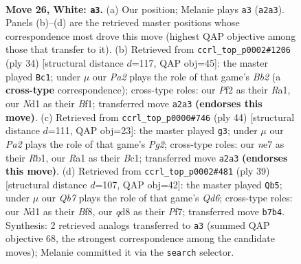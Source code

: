 \documentclass[11pt]{article}
\begin{document}
\clearpage

\begin{figure}[p]\centering
\begin{subfigure}{0.46\textwidth}\centering
\resizebox{\linewidth}{!}{%
\newchessgame
\chessboard[
  setfen={1n1qkb1r/1Q2n3/r1p3p1/p2p2P1/1p1P2Bp/1P5P/PBP1KP2/R2N3R w - - 5 26},
  showmover=false,
  pgfstyle=straightmove, color=movearrow, markmove={a2-a3}
]}
\caption{}
\end{subfigure}\hfill
\begin{subfigure}{0.46\textwidth}\centering
\resizebox{\linewidth}{!}{%
\newchessgame
\chessboard[
  setfen={r2q2k1/ppp2ppb/4nn1p/P2pQ3/8/1PPN1P2/1BP3PP/R4BK1 w - - 3 18},
  showmover=false,
  pgfstyle=straightmove, color=movearrow, markmove={b2-c1}
]}
\caption{}
\end{subfigure}
\\[4pt]
\begin{subfigure}{0.46\textwidth}\centering
\resizebox{\linewidth}{!}{%
\newchessgame
\chessboard[
  setfen={r4r2/1ppqn1pk/p4bnp/4pp1Q/PP6/2PP3P/2B2PP1/1RB1RNK1 w - - 8 23},
  showmover=false,
  pgfstyle=straightmove, color=movearrow, markmove={g2-g3}
]}
\caption{}
\end{subfigure}\hfill
\begin{subfigure}{0.46\textwidth}\centering
\resizebox{\linewidth}{!}{%
\newchessgame
\chessboard[
  setfen={r3kb1r/1p2pp1p/2p1b1p1/p3Pn2/N2P1P2/P2q4/1B1N1RPP/1R1Q2K1 b kq - 1 20},
  showmover=false,
  pgfstyle=straightmove, color=movearrow, markmove={d3-b5}
]}
\caption{}
\end{subfigure}
\caption{\textbf{Move 26, White: \texttt{a3}.} (a) Our position; Melanie plays \texttt{a3} (\texttt{a2a3}). Panels (b)--(d) are the retrieved master positions whose correspondence most drove this move (highest QAP objective among those that transfer to it). (b) Retrieved from \texttt{ccrl\_top\_p0002\#1206} (ply 34) [structural distance $d$=117, QAP obj=45]: the master played \texttt{Bc1}; under $\mu$ our \emph{Pa2} plays the role of that game's \emph{Bb2} (a \textbf{cross-type} correspondence); cross-type roles: our \emph{P}f2 as their \emph{R}a1, our \emph{N}d1 as their \emph{B}f1; transferred move \texttt{a2a3} \textbf{(endorses this move)}. (c) Retrieved from \texttt{ccrl\_top\_p0000\#746} (ply 44) [structural distance $d$=111, QAP obj=23]: the master played \texttt{g3}; under $\mu$ our \emph{Pa2} plays the role of that game's \emph{Pg2}; cross-type roles: our \emph{n}e7 as their \emph{R}b1, our \emph{R}a1 as their \emph{B}c1; transferred move \texttt{a2a3} \textbf{(endorses this move)}. (d) Retrieved from \texttt{ccrl\_top\_p0002\#481} (ply 39) [structural distance $d$=107, QAP obj=42]: the master played \texttt{Qb5}; under $\mu$ our \emph{Qb7} plays the role of that game's \emph{Qd6}; cross-type roles: our \emph{N}d1 as their \emph{B}f8, our \emph{q}d8 as their \emph{P}f7; transferred move \texttt{b7b4}. Synthesis: 2 retrieved analogs transferred to \texttt{a3} (summed QAP objective 68, the strongest correspondence among the candidate moves); Melanie committed it via the \texttt{search} selector.}
\label{fig:thought-m50}
\end{figure}
\end{document}
